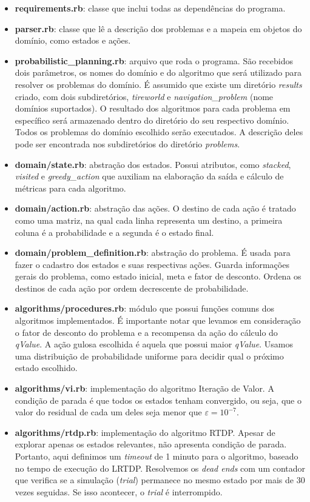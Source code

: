 \documentclass[12pt,a4paper]{article}
\begin{document}
\begin{itemize}
    \item \textbf{requirements.rb}: classe que inclui todas as dependências do programa.
    \item \textbf{parser.rb}: classe que lê a descrição dos problemas e a mapeia em objetos do domínio, como estados e ações.
    \item \textbf{probabilistic\_planning.rb}: arquivo que roda o programa. São recebidos dois parâmetros, os nomes do domínio e do algoritmo que será utilizado para resolver os problemas do domínio. É assumido que existe um diretório \textit{results} criado, com dois subdiretórios, \textit{tireworld} e \textit{navigation\_problem} (nome domínios suportados). O resultado dos algoritmos para cada problema em específico será armazenado dentro do diretório do seu respectivo domínio. Todos os problemas do domínio escolhido serão executados. A descrição deles pode ser encontrada nos subdiretórios do diretório \textit{problems}.
    \item \textbf{domain/state.rb}: abstração dos estados. Possui atributos, como \textit{stacked}, \textit{visited} e \textit{greedy\_action} que auxiliam na elaboração da saída e cálculo de métricas para cada algoritmo.
    \item \textbf{domain/action.rb}: abstração das ações. O destino de cada ação é tratado como uma matriz, na qual cada linha representa um destino, a primeira coluna é a probabilidade e a segunda é o estado final.
    \item \textbf{domain/problem\_definition.rb}: abstração do problema. É usada para fazer o cadastro dos estados e suas respectivas ações. Guarda informações gerais do problema, como estado inicial, meta e fator de desconto. Ordena os destinos de cada ação por ordem decrescente de probabilidade.
    \item \textbf{algorithms/procedures.rb}: módulo que possui funções comuns dos algoritmos implementados. É importante notar que levamos em consideração o fator de desconto do problema e a recompensa da ação do cálculo do \textit{qValue}. A ação gulosa escolhida é aquela que possui maior \textit{qValue}. Usamos uma distribuição de probabilidade uniforme para decidir qual o próximo estado escolhido.
    \item \textbf{algorithms/vi.rb}: implementação do algoritmo Iteração de Valor. A condição de parada é que todos os estados tenham convergido, ou seja, que o valor do residual de cada um deles seja menor que $\varepsilon=10^{-7}$.
    \item \textbf{algorithms/rtdp.rb}: implementação do algoritmo RTDP. Apesar de explorar apenas os estados relevantes, não apresenta condição de parada. Portanto, aqui definimos um \textit{timeout} de 1 minuto para o algoritmo, baseado no tempo de execução do LRTDP. Resolvemos os \textit{dead ends} com um contador que verifica se a simulação (\textit{trial}) permanece no mesmo estado por mais de 30 vezes seguidas. Se isso acontecer, o \textit{trial} é interrompido.

\end{itemize}
\end{document}
